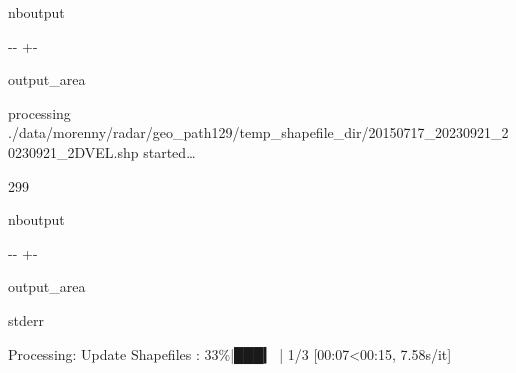 \documentclass[letterpaper,10pt,english]{sphinxmanual}
\begin{document}
\begin{sphinxuseclass}{nboutput}
{

\kern-\sphinxverbatimsmallskipamount\kern-\baselineskip
\kern+\FrameHeightAdjust\kern-\fboxrule
\vspace{\nbsphinxcodecellspacing}

\begin{sphinxuseclass}{output_area}
\begin{sphinxuseclass}{}


\begin{sphinxVerbatim}[commandchars=\\\{\}]
processing ./data/morenny/radar/geo\_path129/temp\_shapefile\_dir/20150717\_20230921\_20230921\_2DVEL.shp started{\ldots}

299
\end{sphinxVerbatim}



\end{sphinxuseclass}
\end{sphinxuseclass}
}

\end{sphinxuseclass}
\begin{sphinxuseclass}{nboutput}
{

\kern-\sphinxverbatimsmallskipamount\kern-\baselineskip
\kern+\FrameHeightAdjust\kern-\fboxrule
\vspace{\nbsphinxcodecellspacing}

\begin{sphinxuseclass}{output_area}
\begin{sphinxuseclass}{stderr}


\begin{sphinxVerbatim}[commandchars=\\\{\}]
Processing: Update Shapefiles :  33\%|███▎      | 1/3 [00:07<00:15,  7.58s/it]
\end{sphinxVerbatim}



\end{sphinxuseclass}
\end{sphinxuseclass}
}

\end{sphinxuseclass}
\end{document}
